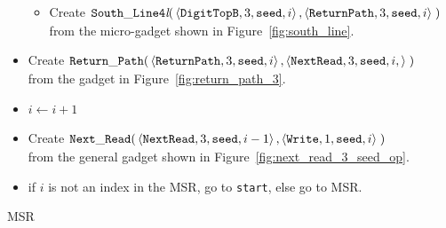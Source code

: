 \begin{itemize}
\begin{itemize}
        \item Create
        $\begin{aligned}[t]
            {\tt South\_Line4\textit{l}}(&\left\langle {\tt DigitTopB},  3, {\tt seed}, i \right\rangle,
                                          \left\langle {\tt ReturnPath}, 3, {\tt seed}, i \right\rangle \;)
        \end{aligned}$\\from the micro-gadget shown in Figure~\ref{fig:south_line}.
    \end{itemize}

    \item Create
    $\begin{aligned}[t]
        {\tt Return\_Path}(&\left\langle {\tt ReturnPath}, 3, {\tt seed}, i  \right\rangle,
                     \left\langle {\tt NextRead},   3, {\tt seed}, i, \right\rangle \;)
    \end{aligned}$\\from the gadget in Figure~\ref{fig:return_path_3}.

    \item $i \gets i + 1$

    \item Create
    $\begin{aligned}[t]
        {\tt Next\_Read}(&\left\langle {\tt NextRead},  3, {\tt seed}, i - 1 \right\rangle,
                   \left\langle {\tt Write},     1, {\tt seed}, i     \right\rangle \;)
    \end{aligned}$\\ from the general gadget shown in Figure~\ref{fig:next_read_3_seed_op}.

    \item if $i$ is not an index in the MSR, go to {\tt start}, else go to MSR.
\end{itemize}

\vspace{1cm}




\Huge{MSR}\normalsize



